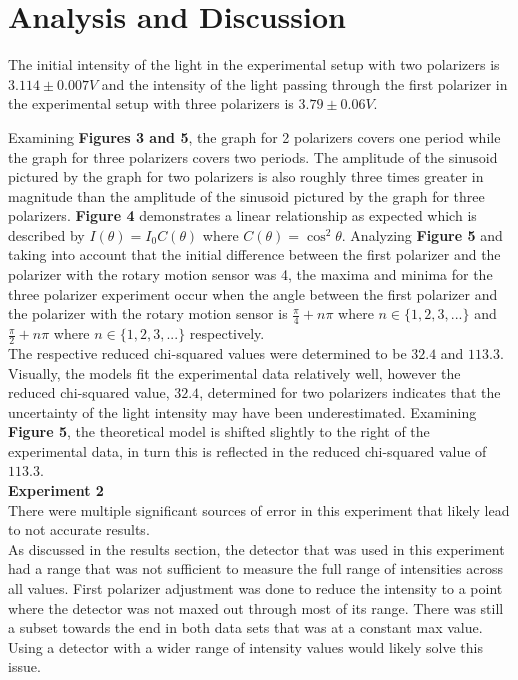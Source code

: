 \documentclass[
	letterpaper, %
	10pt, %
]{CSUniSchoolLabReport}
\begin{document}
\section{Analysis and Discussion}
The initial intensity of the light in the experimental setup with two polarizers is $3.114 \pm 0.007 V$ and the intensity
of the light passing through the first polarizer in the experimental setup with three polarizers is $3.79 \pm 0.06 V$.

Examining \textbf{Figures 3 and 5}, the graph for 2 polarizers covers one period while the graph for three polarizers covers
two periods. The amplitude of the sinusoid pictured by the graph for two polarizers is also roughly three times greater
in magnitude than the amplitude of the sinusoid pictured by the graph for three polarizers. \textbf{Figure 4} demonstrates a
linear relationship as expected which is described by $I(\theta) = I_0C(\theta)$ where $C(\theta) = \cos^2\theta$.
Analyzing \textbf{Figure 5} and taking into account that the initial difference between the first polarizer and the
polarizer with the rotary motion sensor was 4, the maxima and minima for the three polarizer experiment occur when the
angle between the first polarizer and the polarizer with the rotary motion sensor is $\frac{\pi}{4} + n\pi$
where $n\in \{1, 2, 3, ...\}$ and $\frac{\pi}{2}+n\pi$ where $n\in\{1, 2, 3, ...\}$
respectively.\\

The respective reduced chi-squared values were determined to be $32.4$ and $113.3$. Visually, the models fit the experimental
data relatively well, however the reduced chi-squared value, $32.4$, determined for two polarizers indicates that the uncertainty
of the light intensity may have been underestimated. Examining \textbf{Figure 5}, the theoretical model is shifted slightly to the
right of the experimental data, in turn this is reflected in the reduced chi-squared value of $113.3$.\\

\textbf{Experiment 2}\\
There were multiple significant sources of error in this experiment that likely lead to
not accurate results. \\

As discussed in the results section, the detector that was used in this experiment had a range that was not sufficient to measure
the full range of intensities across all values. First polarizer adjustment was done to reduce the
intensity to a point where the detector was not maxed out through most of its range. There was still a subset
towards the end in both data sets that was at a constant max value. Using a detector with a wider
range of intensity values would likely solve this issue.\\
\end{document}
